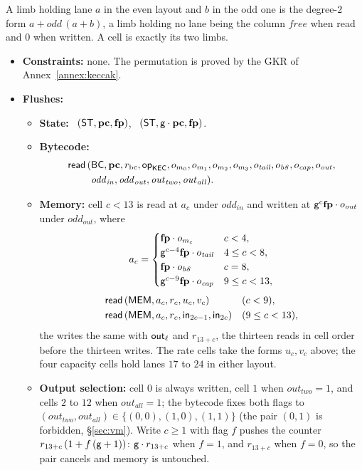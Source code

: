 A limb holding lane $a$ in the even layout and $b$ in the odd one is the degree-$2$ form $a+\mathit{odd}\,(a+b)$, a limb holding no lane being the column $\mathit{free}$ when read and $0$ when written. A cell is exactly its two limbs.
\begin{itemize}
\item \textbf{Constraints:} none. The permutation is proved by the GKR of Annex~\ref{annex:keccak}.
\item \textbf{Flushes:}
  \begin{itemize}
  \item \textbf{State:} \pull\ $( \mathsf{ST},\mathbf{pc},\mathbf{fp} )$, \push\ $( \mathsf{ST},\mathsf{g}\cdot\mathbf{pc},\mathbf{fp} )$.
  \item \textbf{Bytecode:}
    \[
      \begin{aligned}
        \mathsf{read}\,(&\mathsf{BC},\mathbf{pc},r_{\mathrm{bc}},\mathsf{op}_{\mathsf{KEC}},o_{m_0},o_{m_1},o_{m_2},o_{m_3},o_{\mathit{tail}},o_{\mathit{b8}},o_{\mathit{cap}},o_{\mathit{out}},\\
        &\mathit{odd}_{\mathit{in}},\mathit{odd}_{\mathit{out}},\mathit{out}_{\mathit{two}},\mathit{out}_{\mathit{all}}).
      \end{aligned}
    \]
  \item \textbf{Memory:} cell $c<13$ is read at $a_c$ under $\mathit{odd}_{\mathit{in}}$ and written at $\mathsf{g}^{c}\mathbf{fp}\cdot o_{\mathit{out}}$ under $\mathit{odd}_{\mathit{out}}$, where
    \[
      a_c=\begin{cases}
        \mathbf{fp}\cdot o_{m_c} & c<4,\\
        \mathsf{g}^{c-4}\mathbf{fp}\cdot o_{\mathit{tail}} & 4\le c<8,\\
        \mathbf{fp}\cdot o_{\mathit{b8}} & c=8,\\
        \mathsf{g}^{c-9}\mathbf{fp}\cdot o_{\mathit{cap}} & 9\le c<13,
      \end{cases}
    \]
    \begin{align*}
      &\mathsf{read}\,( \mathsf{MEM},a_c,r_c,u_c,v_c ) &&(c<9),\\
      &\mathsf{read}\,( \mathsf{MEM},a_c,r_c,\mathsf{in}_{2c-1},\mathsf{in}_{2c} ) &&(9\le c<13),
    \end{align*}
    the writes the same with $\mathsf{out}_{\ell}$ and $r_{13+c}$, the thirteen reads in cell order before the thirteen writes. The rate cells take the forms $u_c,v_c$ above; the four capacity cells hold lanes $17$ to $24$ in either layout.
  \item \textbf{Output selection:} cell $0$ is always written, cell $1$ when $\mathit{out}_{\mathit{two}}=1$, and cells $2$ to $12$ when $\mathit{out}_{\mathit{all}}=1$; the bytecode fixes both flags to $(\mathit{out}_{\mathit{two}},\mathit{out}_{\mathit{all}})\in\{(0,0),(1,0),(1,1)\}$ (the pair $(0,1)$ is forbidden, \S\ref{sec:vm}). Write $c\ge1$ with flag $f$ pushes the counter $r_{13+c}\,(1+f\,(\mathsf{g}+1))$: $\mathsf{g}\cdot r_{13+c}$ when $f=1$, and $r_{13+c}$ when $f=0$, so the pair cancels and memory is untouched.
  \end{itemize}
\end{itemize}
